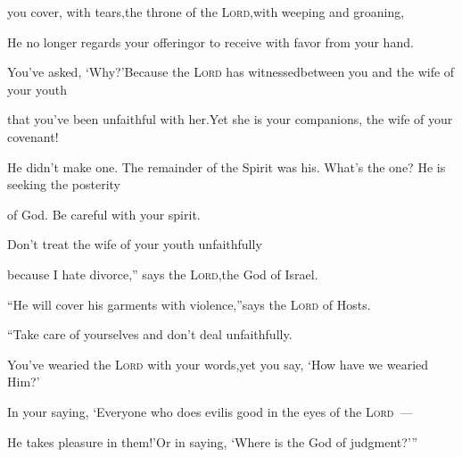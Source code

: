 \begin{inparaenum}
  \pb you cover, with tears,\pa the throne of the \textsc{Lord},\pa with weeping and groaning,%
  
  \pb He no longer regards your offering\pa or to receive with favor from your hand.%
  
  \pa {} You've asked, `Why?'\pa Because the \textsc{Lord} has witnessed\pa between you and the wife of your youth%
  
  \pb that you've been unfaithful with her.\pa Yet she is your companions, the wife of your covenant!%
  
  \pa {}%
  He didn't make one. The remainder of the Spirit was his. What's the one? He is seeking the posterity%
  
  \pc of God. Be careful with your spirit.%
  
  \pe%
  Don't treat the wife of your youth unfaithfully%
  
  \pa {} because I hate divorce,''%
  \pa says the \textsc{Lord},\pa the God of Israel.%
  
  \pb ``He will cover his garments with violence,''\pa says the \textsc{Lord} of Hosts.%
  
  \pc ``Take care of yourselves%
  and don't deal unfaithfully.%
  
  \pa {} You've wearied the \textsc{Lord} with your words,\pa yet you say, `How have we wearied Him?'%
  
  \pb In your saying, `Everyone who does evil\pa is good in the eyes of the \textsc{Lord}~---%
  
  \pb He takes pleasure in them!'\pa Or in saying, `Where is the God of judgment?'\thinspace''%
\end{inparaenum}
